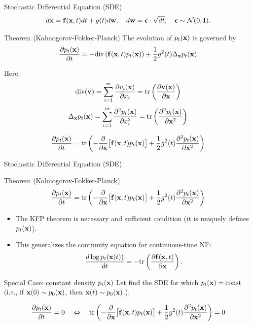 \documentclass{beamer}
\renewcommand{\eqpause}{}
\begin{document}
\begin{frame}{Stochastic Differential Equation (SDE)}
	\vspace{-0.4cm}
	\[
		d\mathbf{x} = \mathbf{f}(\mathbf{x}, t) dt + g(t) d \mathbf{w},\quad d \mathbf{w} = \boldsymbol{\epsilon} \cdot \sqrt{dt},\quad \boldsymbol{\epsilon} \sim \mathcal{N}(0, \mathbf{I}).
	\]
	\vspace{-0.4cm}
	\begin{block}{Theorem (Kolmogorov-Fokker-Planck)}
		The evolution of $p_t(\mathbf{x})$ is governed by
		\vspace{-0.2cm}
		\[
			\frac{\partial p_t(\mathbf{x})}{\partial t} = - \text{div}\left(\mathbf{f}(\mathbf{x}, t) p_t(\mathbf{x})\right) + \frac{1}{2}g^2(t) \Delta_{\mathbf{x}}p_t(\mathbf{x})
		\]
		\eqpause
		Here,
		\[
			\text{div} (\mathbf{v}) = \sum_{i=1}^m \frac{\partial v_i(\mathbf{x})}{\partial x_i} = \text{tr}\left( \frac{\partial \mathbf{v}(\mathbf{x})}{\partial \mathbf{x}}  \right)
		\]
		\[
			\Delta_{\mathbf{x}}p_t(\mathbf{x}) = \sum_{i=1}^m \frac{\partial^2 p_t(\mathbf{x})}{\partial x_i^2} = \text{tr}\left( \frac{\partial^2 p_t(\mathbf{x})}{\partial \mathbf{x}^2}  \right)
		\]
		\eqpause
		\[
			\frac{\partial p_t(\mathbf{x})}{\partial t} = \text{tr}\left( - \frac{\partial}{\partial \mathbf{x}} \bigl[ \mathbf{f}(\mathbf{x}, t) p_t(\mathbf{x})\bigr] + \frac{1}{2} g^2(t) \frac{\partial^2 p_t(\mathbf{x})}{\partial \mathbf{x}^2} \right)
		\]
	\end{block}
\end{frame}
\begin{frame}{Stochastic Differential Equation (SDE)}
	\begin{block}{Theorem (Kolmogorov-Fokker-Planck)}
		\vspace{-0.2cm}
		\[
			\frac{\partial p_t(\mathbf{x})}{\partial t} = \text{tr}\left( - \frac{\partial}{\partial \mathbf{x}} \bigl[ \mathbf{f}(\mathbf{x}, t) p_t(\mathbf{x})\bigr] + \frac{1}{2} g^2(t) \frac{\partial^2 p_t(\mathbf{x})}{\partial \mathbf{x}^2}\right)
		\]
		\vspace{-0.2cm}
	\end{block}
	\begin{itemize}
		\item The KFP theorem is necessary and sufficient condition (it is uniquely defines $p_t(\mathbf{x})$).
		\item This generalizes the continuity equation for continuous-time NF:
		\[
			\frac{d \log p_t(\mathbf{x}(t))}{d t} = - \text{tr} \left( \frac{\partial \mathbf{f}(\mathbf{x}, t)}{\partial \mathbf{x}} \right).
		\]
	\end{itemize}
	\eqpause
	\vspace{-0.3cm}
	\begin{block}{Special Case: constant density $p_t(\mathbf{x})$}
		Let find the SDE for which $p_t(\mathbf{x}) = \text{const}$ (i.e., if $\mathbf{x}(0) \sim p_0(\mathbf{x})$, then $\mathbf{x}(t) \sim p_0(\mathbf{x})$.).
		\eqpause
		\[
			\frac{\partial p_t(\mathbf{x})}{\partial t} = 0 \quad \Leftrightarrow \quad \text{tr}\left( - \frac{\partial}{\partial \mathbf{x}} \bigl[ \mathbf{f}(\mathbf{x}, t) p_t(\mathbf{x})\bigr] + \frac{1}{2} g^2(t) \frac{\partial^2 p_t(\mathbf{x})}{\partial \mathbf{x}^2}\right) = 0
		\]
	\end{block}
\end{frame}
\end{document}
